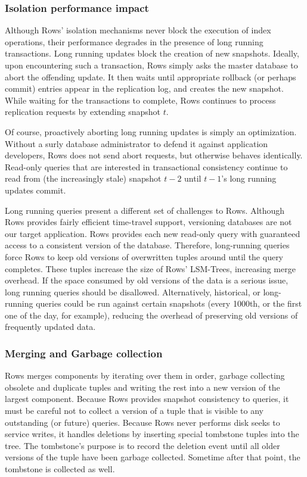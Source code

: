 \documentclass{sig-alternate-sigmod08}
\newcommand{\rows}{Rows\xspace}
\newcommand{\rowss}{Rows'\xspace}
\begin{document}
\subsubsection{Isolation performance impact}

Although \rowss isolation mechanisms never block the execution of
index operations, their performance degrades in the presence of long
running transactions. Long running updates block the creation of new
snapshots.  Ideally, upon encountering such a transaction, \rows
simply asks the master database to abort the offending update.  It
then waits until appropriate rollback (or perhaps commit) entries
appear in the replication log, and creates the new snapshot.  While
waiting for the transactions to complete, \rows continues to process
replication requests by extending snapshot $t$.

Of course, proactively aborting long running updates is simply an
optimization.  Without a surly database administrator to defend it
against application developers, \rows does not send abort requests,
but otherwise behaves identically.  Read-only queries that are
interested in transactional consistency continue to read from (the
increasingly stale) snapshot $t-2$ until $t-1$'s long running
updates commit.

Long running queries present a different set of challenges to \rows.
Although \rows provides fairly efficient time-travel support,
versioning databases are not our target application.  \rows
provides each new read-only query with guaranteed access to a
consistent version of the database.  Therefore, long-running queries
force \rows to keep old versions of overwritten tuples around until
the query completes.  These tuples increase the size of \rowss
LSM-Trees, increasing merge overhead.  If the space consumed by old
versions of the data is a serious issue, long running queries should
be disallowed.  Alternatively, historical, or long-running queries
could be run against certain snapshots (every 1000th, or the first
one of the day, for example), reducing the overhead of preserving
old versions of frequently updated data.

\subsubsection{Merging and Garbage collection}

\rows merges components by iterating over them in order, garbage collecting
obsolete and duplicate tuples and writing the rest into a new version
of the largest component.  Because \rows provides snapshot consistency
to queries, it must be careful not to collect a version of a tuple that
is visible to any outstanding (or future) queries.  Because \rows
never performs disk seeks to service writes, it handles deletions by
inserting special tombstone tuples into the tree.  The tombstone's
purpose is to record the deletion event until all older versions of
the tuple have been garbage collected.  Sometime after that point, the tombstone
is collected as well.
\end{document}
